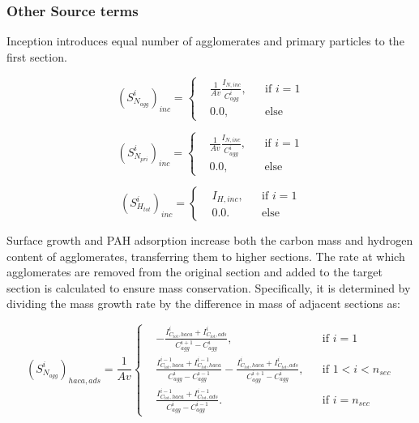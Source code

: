 \subsubsection{Other Source terms}
\label{sec:sectothersource}

Inception introduces equal number of agglomerates and primary particles to the first section.

\begin{equation}
	\left(S^i_{N_{agg}}\right)_{inc} =
	\left\{
	\begin{aligned}
		&\frac{1}{Av}\frac{I_{N, inc}}{C^i_{agg}}, && \text{if } i=1\\
		& 0.0                                   , && \text{else}
	\end{aligned}
	\right.
	\label{eqn:S_Nagg_incsect}
\end{equation}

\begin{equation}
	\left(S^i_{N_{pri}}\right)_{inc} =
	\left\{
	\begin{aligned}
		&\frac{1}{Av}\frac{I_{N, inc}}{C^i_{agg}}, && \text{if } i=1\\
		& 0.0                                   , && \text{else}
	\end{aligned}
	\right.
	\label{eqn:S_Npri_incsect}
\end{equation}


\begin{equation}
	\left(S^i_{H_{tot}}\right)_{inc} =
	\left\{
	\begin{aligned}
		&I_{H, inc},  && \text{if } i=1\\
		& 0.0       . && \text{else}
	\end{aligned}
	\right.
	\label{eqn:S_Htot_incsect}
\end{equation}

Surface growth and PAH adsorption increase both the carbon mass and hydrogen content of agglomerates, transferring them to higher sections. The rate at which agglomerates are removed from the original section and added to the target section is calculated to ensure mass conservation. Specifically, it is determined by dividing the mass growth rate by the difference in mass of adjacent sections as:


\begin{equation}
	\left(S^i_{N_{agg}}\right)_{haca, ads}=
	\frac{1}{Av}
	\left\{
	\begin{aligned}
		&-\frac{I^i_{C_{tot},haca}+I^i_{C_{tot},ads}}{C^{i+1}_{agg}-C^{i}_{agg}},
		&&
		\text{if } i = 1
		\\
		&\frac{I^{i-1}_{C_{tot},haca}+I^{i-1}_{C_{tot},haca}}{C^{i}_{agg}-C^{i-1}_{agg}}
		-\frac{I^{i}_{C_{tot},haca}+I^{i}_{C_{tot},ads}}{C^{i+1}_{agg}-C^{i}_{agg}},
		&&
		\text{if } 1 < i < n_{sec}
		\\
		&\frac{I^{i-1}_{C_{tot},haca}+I^{i-1}_{C_{tot},ads}}{C^{i}_{agg}-C^{i-1}_{agg}}.
		&&\text{if } i=n_{sec}
	\end{aligned}
	\right.
	\label{eqn:S_Nagg_gradssect}
\end{equation}

